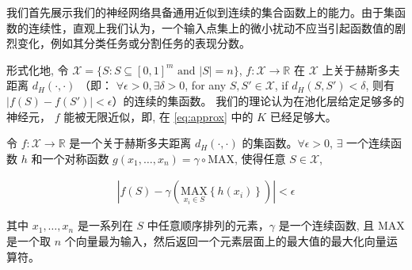 我们首先展示我们的神经网络具备通用近似到连续的集合函数上的能力。由于集函数的连续性，直观上我们认为，一个输入点集上的微小扰动不应当引起函数值的剧烈变化，例如其分类任务或分割任务的表现分数。


形式化地, 令 $\mathcal{X}=\{S: S\subseteq [0,1]^m \text{ and } |S|=n\}$,   $f:\mathcal{X}\rightarrow \mathbb{R}$ 在 $\mathcal{X}$ 上关于赫斯多夫距离 $d_H(\cdot, \cdot)$ （即： $\forall \epsilon > 0, \exists \delta >0$, for any $S, S'\in\mathcal{X}$, if $d_H(S, S') < \delta$, 则有 $|f(S)-f(S')|< \epsilon$）的连续的集函数。 我们的理论认为在池化层给定足够多的神经元， $f$ 能被无限近似，即, 在 \eqref{eq:approx} 中的 $K$ 
已经足够大。


\begin{theorem}

令 $f:\mathcal{X}\rightarrow \mathbb{R}$ 是一个关于赫斯多夫距离 $d_H(\cdot, \cdot)$ 的集函数。$\forall \epsilon > 0$, $\exists$ 一个连续函数 $h$ 和一个对称函数 $g(x_1, \dots, x_n)=\gamma \circ \mbox{MAX}$, 使得任意 $S\in\mathcal{X}$,



\begin{align*}
	\left|f(S) - \gamma\left(\underset{x_i\in S}{\mbox{MAX}}\left\{h(x_i)\right\}\right)\right| < \epsilon
\end{align*}

其中 $x_1, \ldots, x_n$ 是一系列在 $S$ 中任意顺序排列的元素，$\gamma$ 是一个连续函数, 且 $\mbox{MAX}$ 是一个取 $n$ 个向量最为输入，然后返回一个元素层面上的最大值的最大化向量运算符。

\end{theorem}

